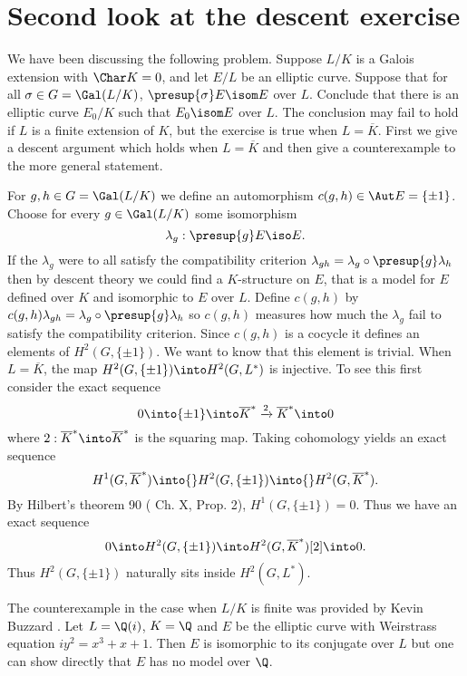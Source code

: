 \documentclass{report}
\begin{document}
\section{Second look at the descent exercise}
We have been discussing the following problem. Suppose $L/K$
is a Galois extension with $\Char K=0$, and let $E/L$ be
an elliptic curve. Suppose that for all $\sigma\in{}G=\Gal(L/K)$,
$\presup{\sigma}E\isom E$ over $L$. Conclude that there is
an elliptic curve $E_0/K$ such that $E_0\isom E$ over $L$.
The conclusion may fail to hold if $L$ is a finite extension
of $K$, but the exercise is true when $L=\overline{K}$. First we
give a descent argument which holds when $L=\overline{K}$ and
then give a counterexample to the more general statement.

For $g,h\in{}G=\Gal(L/K)$ we define an automorphism
$c(g,h)\in\Aut E=\{\pm 1\}$. Choose for every $g\in\Gal(L/K)$ some
isomorphism $$\lambda_g:\presup{g}E\iso E.$$
If the $\lambda_g$ were to all satisfy the compatibility criterion
$\lambda_{gh}=\lambda_g\circ\presup{g}\lambda_h$ then by
descent theory we could find a $K$-structure on $E$, that
is a model for $E$ defined over $K$ and isomorphic to $E$ over $L$.
Define $c(g,h)$ by $c(g,h)\lambda_{gh}=\lambda_{g}\circ\presup{g}\lambda_h$
so $c(g,h)$ measures how much the $\lambda_g$ fail to satisfy
the compatibility criterion. Since $c(g,h)$ is a cocycle it defines
an elements of $H^2(G,\{\pm 1\})$. We want to know that this element
is trivial.
When $L=\overline{K}$, the map
$H^2(G,\{\pm 1\})\into H^2(G,L^{*})$ is injective.  To see this first
consider the exact sequence
$$0\into\{\pm 1\}\into\overline{K}^{*}\xrightarrow{2}\overline{K}^{*}\into 0$$
where $2:\overline{K}^{*}\into\overline{K}^{*}$ is the squaring map.
Taking cohomology yields an exact sequence
$$H^1(G,\overline{K}^{*})\into{}H^2(G,\{\pm 1\})
           \into{}H^2(G,\overline{K}^{*}).$$
By Hilbert's theorem 90 (\cite{serre:localfields} Ch. X, Prop. 2),
$H^1(G,\{\pm 1\})=0$. Thus we have an exact sequence
$$0\into H^2(G,\{\pm 1\})\into H^2(G,\overline{K}^{*})[2]\into 0.$$
Thus $H^2(G,\{\pm 1\})$ naturally sits inside $H^2(G,L^*)$.


The counterexample in the case when $L/K$ is finite was
provided by Kevin Buzzard . Let $L=\Q(i)$, $K=\Q$ and $E$ be the elliptic curve
with Weirstrass equation $iy^2=x^3+x+1$. Then $E$ is
isomorphic to its conjugate over $L$ but one can show directly
that $E$ has no model over $\Q$.  
\end{document}
